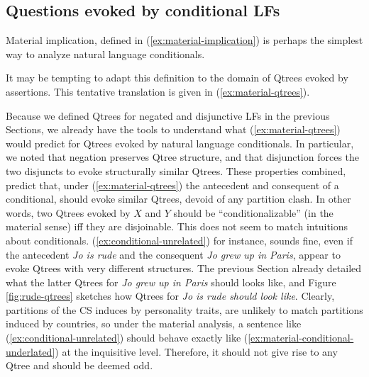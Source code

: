 \subsection{Questions evoked by conditional LFs}

Material implication, defined in (\ref{ex:material-implication}) is perhaps the simplest way to analyze natural language conditionals. 

\begin{exe}
	\label{ex:material-implication}
\end{exe}

It may be tempting to adapt this definition to the domain of Qtrees evoked by assertions. This tentative translation is given in (\ref{ex:material-qtrees}). 

\begin{exe}
	\label{ex:material-qtrees}
\end{exe}

Because we defined Qtrees for negated and disjunctive LFs in the previous Sections, we already have the tools to understand what (\ref{ex:material-qtrees}) would predict for Qtrees evoked by natural language conditionals. In particular, we noted that negation preserves Qtree structure, and that disjunction forces the two disjuncts to evoke structurally similar Qtrees. These properties combined, predict that, under (\ref{ex:material-qtrees}) the antecedent and consequent of a conditional, should evoke similar Qtrees, devoid of any partition clash. In other words, two Qtrees evoked by $X$ and $Y$ should be ``conditionalizable'' (in the material sense) iff they are disjoinable. This does not seem to match intuitions about conditionals. (\ref{ex:conditional-unrelated}) for instance, sounds fine, even if the antecedent \textit{Jo is rude} and the consequent \textit{Jo grew up in Paris}, appear to evoke Qtrees with very different structures. The previous Section already detailed what the latter Qtrees for \textit{Jo grew up in Paris} should looks like, and Figure \ref{fig:rude-qtrees} sketches how Qtrees for \textit{Jo is rude should look like}. Clearly, partitions of the CS induces by personality traits, are unlikely to match partitions induced by countries, so under the material analysis, a sentence like (\ref{ex:conditional-unrelated}) should behave exactly like (\ref{ex:material-conditional-underlated}) at the inquisitive level. Therefore, it should not give rise to any Qtree and should be deemed odd.

